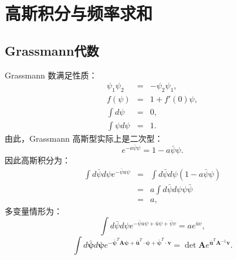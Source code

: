 \documentclass[10pt,UTF8]{ctexart}
\begin{document}
\section*{高斯积分与频率求和}
\subsection*{Grassmann代数}
\noindent
Grassmann 数满足性质：
\begin{eqnarray}
	\psi_{1}\psi_{2} &=& -\psi_{2}\psi_{1}, \\
	f(\psi) &=& 1+f'(0)\psi, \\
	\int d\psi &=& 0, \\
	\int \psi d\psi &=& 1.
\end{eqnarray}
由此，Grassmann 高斯型实际上是二次型：
\begin{equation}
	e^{-a\bar{\psi}\psi}=1-a\bar{\psi}\psi.
\end{equation}
因此高斯积分为：
\begin{eqnarray}
	\int d\bar{\psi}d\psi e^{-\bar{\psi}a\psi} & = & \int d\bar{\psi}d\psi\left(1-a\bar{\psi}\psi\right)\\
 	& = & a\int d\bar{\psi}d\psi\psi\bar{\psi}\\
 	& = & a,
\end{eqnarray}
多变量情形为：
\begin{equation}
	\int d\bar{\psi}d\psi e^{-\bar{\psi}a\psi+\bar{u}\psi+\bar{\psi}v}=ae^{\bar{u}v},
\end{equation}
\begin{equation}
	\int d\bar{\bm{\psi}}d\bm{\psi}e^{-\bar{\bm{\psi}}^{T}\bm{A}\bm{\psi}+\bar{\bm{u}}^{T}\cdot\bm{\psi}+\bar{\bm{\psi}}^{T}\cdot\bm{v}}=\det\bm{A}e^{\bar{\bm{u}}^{T}\bm{A}^{-1}\bm{v}}.
\end{equation}
\end{document}

